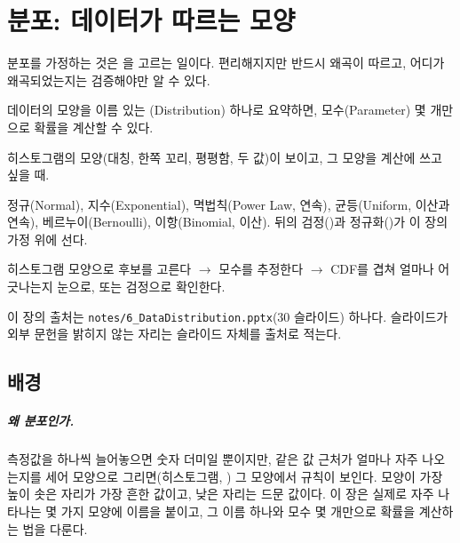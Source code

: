 \chapter{분포: 데이터가 따르는 모양}
\label{ch:distributions}

\begin{keyidea}
분포를 가정하는 것은 을 고르는 일이다. 편리해지지만 반드시
왜곡이 따르고, 어디가 왜곡되었는지는 검증해야만 알 수 있다.
\end{keyidea}

\begin{inbrief}
  \item[Why] 데이터의 모양을 이름 있는 (Distribution) 하나로
             요약하면, 모수(Parameter) 몇 개만으로 확률을 계산할 수 있다.
  \item[When] 히스토그램의 모양(대칭, 한쪽 꼬리, 평평함, 두 값)이 보이고,
              그 모양을 계산에 쓰고 싶을 때.
  \item[Where] 정규(Normal), 지수(Exponential), 멱법칙(Power Law, 연속),
               균등(Uniform, 이산과 연속), 베르누이(Bernoulli),
               이항(Binomial, 이산). 뒤의 검정()과
               정규화()가 이 장의 가정 위에 선다.
  \item[How] 히스토그램 모양으로 후보를 고른다 $\to$ 모수를 추정한다
             $\to$ CDF를 겹쳐 얼마나 어긋나는지 눈으로, 또는 검정으로
             확인한다.
\end{inbrief}

이 장의 출처는 \texttt{notes/6\_DataDistribution.pptx}(30 슬라이드) 하나다.
슬라이드가 외부 문헌을 밝히지 않는 자리는 슬라이드 자체를 출처로 적는다.

\section{배경}
\label{sec:dist-background}

\paragraph{왜 분포인가.} 측정값을 하나씩 늘어놓으면 숫자 더미일 뿐이지만,
같은 값 근처가 얼마나 자주 나오는지를 세어 모양으로 그리면(히스토그램,
) 그 모양에서 규칙이 보인다. 모양이 가장 높이 솟은
자리가 가장 흔한 값이고, 낮은 자리는 드문 값이다. 이 장은 실제로 자주
나타나는 몇 가지 모양에 이름을 붙이고, 그 이름 하나와 모수 몇 개만으로
확률을 계산하는 법을 다룬다.


